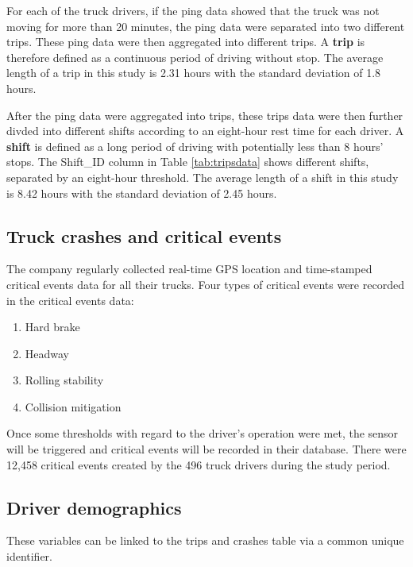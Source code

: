 \documentclass[12pt]{book}
\numberwithin{equation}{chapter}
\providecommand{\tightlist}{%
  \setlength{\itemsep}{0pt}\setlength{\parskip}{0pt}}
\begin{document}
For each of the truck drivers, if the ping data showed that the truck was not moving for more than 20 minutes, the ping data were separated into two different trips.
These ping data were then aggregated into different trips.
A \textbf{trip} is therefore defined as a continuous period of driving without stop.
The average length of a trip in this study is 2.31 hours with the standard deviation of 1.8 hours.

After the ping data were aggregated into trips, these trips data were then further divded into different shifts according to an eight-hour rest time for each driver.
A \textbf{shift} is defined as a long period of driving with potentially less than 8 hours' stops.
The Shift\_ID column in Table \ref{tab:tripsdata} shows different shifts, separated by an eight-hour threshold.
The average length of a shift in this study is 8.42 hours with the standard deviation of 2.45 hours.

\hypertarget{truck-crashes-and-critical-events}{%
\subsection{Truck crashes and critical events}\label{truck-crashes-and-critical-events}}

The company regularly collected real-time GPS location and time-stamped critical events data for all their trucks.
Four types of critical events were recorded in the critical events data:

\begin{enumerate}
\def\labelenumi{\arabic{enumi}.}
\tightlist
\item
  Hard brake
\item
  Headway
\item
  Rolling stability
\item
  Collision mitigation
\end{enumerate}

Once some thresholds with regard to the driver's operation were met, the sensor will be triggered and critical events will be recorded in their database.
There were 12,458 critical events created by the 496 truck drivers during the study period.

\hypertarget{driver-demographics}{%
\subsection{Driver demographics}\label{driver-demographics}}

These variables can be linked to the trips and crashes table via a common unique identifier.
\end{document}
